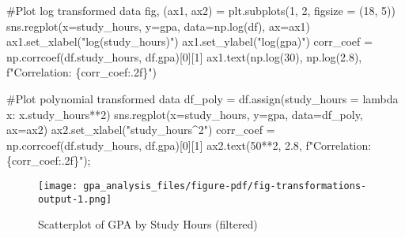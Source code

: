 \documentclass[
  letterpaper,
  DIV=11,
  numbers=noendperiod]{scrreprt}
\newenvironment{Shaded}{\begin{snugshade}}{\end{snugshade}}
\newcommand{\CommentTok}[1]{\textcolor[rgb]{0.37,0.37,0.37}{#1}}
\newcommand{\DecValTok}[1]{\textcolor[rgb]{0.68,0.00,0.00}{#1}}
\newcommand{\FloatTok}[1]{\textcolor[rgb]{0.68,0.00,0.00}{#1}}
\newcommand{\KeywordTok}[1]{\textcolor[rgb]{0.00,0.23,0.31}{#1}}
\newcommand{\NormalTok}[1]{\textcolor[rgb]{0.00,0.23,0.31}{#1}}
\newcommand{\OperatorTok}[1]{\textcolor[rgb]{0.37,0.37,0.37}{#1}}
\newcommand{\SpecialCharTok}[1]{\textcolor[rgb]{0.37,0.37,0.37}{#1}}
\newcommand{\SpecialStringTok}[1]{\textcolor[rgb]{0.13,0.47,0.30}{#1}}
\newcommand{\StringTok}[1]{\textcolor[rgb]{0.13,0.47,0.30}{#1}}
\begin{document}
\begin{Shaded}
\begin{Highlighting}[]
\CommentTok{\#Plot log transformed data}
\NormalTok{fig, (ax1, ax2) }\OperatorTok{=}\NormalTok{ plt.subplots(}\DecValTok{1}\NormalTok{, }\DecValTok{2}\NormalTok{, figsize }\OperatorTok{=}\NormalTok{ (}\DecValTok{18}\NormalTok{, }\DecValTok{5}\NormalTok{))}
\NormalTok{sns.regplot(x}\OperatorTok{=}\StringTok{\textquotesingle{}study\_hours\textquotesingle{}}\NormalTok{, y}\OperatorTok{=}\StringTok{\textquotesingle{}gpa\textquotesingle{}}\NormalTok{, data}\OperatorTok{=}\NormalTok{np.log(df), ax}\OperatorTok{=}\NormalTok{ax1)}
\NormalTok{ax1.set\_xlabel(}\StringTok{"log(study\_hours)"}\NormalTok{)}
\NormalTok{ax1.set\_ylabel(}\StringTok{"log(gpa)"}\NormalTok{)}
\NormalTok{corr\_coef }\OperatorTok{=}\NormalTok{ np.corrcoef(df.study\_hours, df.gpa)[}\DecValTok{0}\NormalTok{][}\DecValTok{1}\NormalTok{]}
\NormalTok{ax1.text(np.log(}\DecValTok{30}\NormalTok{), np.log(}\FloatTok{2.8}\NormalTok{), }\SpecialStringTok{f"Correlation: }\SpecialCharTok{\{}\NormalTok{corr\_coef}\SpecialCharTok{:.2f\}}\SpecialStringTok{"}\NormalTok{)}

\CommentTok{\#Plot polynomial transformed data}
\NormalTok{df\_poly }\OperatorTok{=}\NormalTok{ df.assign(study\_hours }\OperatorTok{=} \KeywordTok{lambda}\NormalTok{ x: x.study\_hours}\OperatorTok{**}\DecValTok{2}\NormalTok{)}
\NormalTok{sns.regplot(x}\OperatorTok{=}\StringTok{\textquotesingle{}study\_hours\textquotesingle{}}\NormalTok{, y}\OperatorTok{=}\StringTok{\textquotesingle{}gpa\textquotesingle{}}\NormalTok{, data}\OperatorTok{=}\NormalTok{df\_poly, ax}\OperatorTok{=}\NormalTok{ax2)}
\NormalTok{ax2.set\_xlabel(}\StringTok{"study\_hours\^{}2"}\NormalTok{)}
\NormalTok{corr\_coef }\OperatorTok{=}\NormalTok{ np.corrcoef(df.study\_hours, df.gpa)[}\DecValTok{0}\NormalTok{][}\DecValTok{1}\NormalTok{]}
\NormalTok{ax2.text(}\DecValTok{50}\OperatorTok{**}\DecValTok{2}\NormalTok{, }\FloatTok{2.8}\NormalTok{, }\SpecialStringTok{f"Correlation: }\SpecialCharTok{\{}\NormalTok{corr\_coef}\SpecialCharTok{:.2f\}}\SpecialStringTok{"}\NormalTok{)}\OperatorTok{;}
\end{Highlighting}
\end{Shaded}

\begin{figure}[H]

{\centering \texttt{[image: gpa\_analysis\_files/figure-pdf/fig-transformations-output-1.png]}

}

\caption{\label{fig-transformations}Scatterplot of GPA by Study Hours
(filtered)}

\end{figure}
\end{document}
